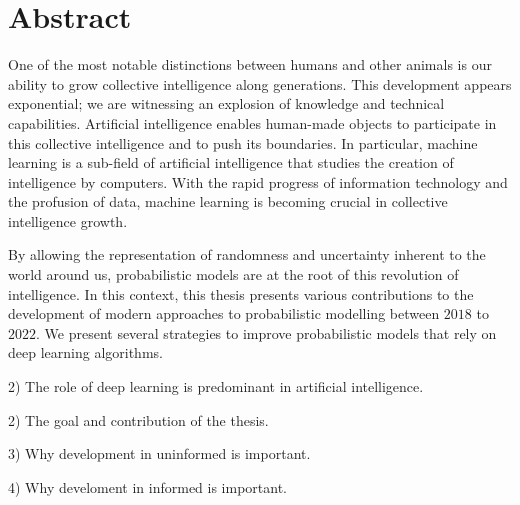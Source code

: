 
\chapter*{Abstract}
One of the most notable distinctions between humans and other animals is our ability to grow collective intelligence along generations. This development appears exponential; we are witnessing an explosion of knowledge and technical capabilities. Artificial intelligence enables human-made objects to participate in this collective intelligence and to push its boundaries. In particular, machine learning is a sub-field of artificial intelligence that studies the creation of intelligence by computers. With the rapid progress of information technology and the profusion of data, machine learning is becoming crucial in collective intelligence growth.

By allowing the representation of randomness and uncertainty inherent to the world around us, probabilistic models are at the root of this revolution of intelligence. In this context, this thesis presents various contributions to the development of modern approaches to probabilistic modelling between $2018$ to $2022$. We present several strategies to improve probabilistic models that rely on deep learning algorithms.

2) The role of deep learning is predominant in artificial intelligence.

2) The goal and contribution of the thesis.

3) Why development in uninformed is important.

4) Why develoment in informed is important.
